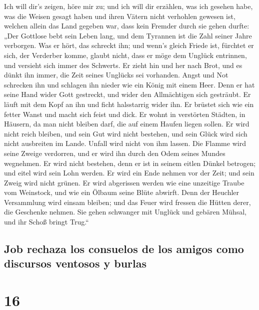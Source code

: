  Ich will dir's zeigen, höre mir zu; und ich will dir
erzählen, was ich gesehen habe,  was die Weisen gesagt
haben und ihren Vätern nicht verhohlen gewesen ist, 
welchen allein das Land gegeben war, dass kein Fremder durch sie gehen
durfte:  „Der Gottlose bebt sein Leben lang, und dem
Tyrannen ist die Zahl seiner Jahre verborgen.  Was er
hört, das schreckt ihn; und wenn's gleich Friede ist, fürchtet er sich,
der Verderber komme,  glaubt nicht, dass er möge dem
Unglück entrinnen, und versieht sich immer des Schwerts. 
Er zieht hin und her nach Brot, und es dünkt ihn immer, die Zeit seines
Unglücks sei vorhanden.  Angst und Not schrecken ihn und
schlagen ihn nieder wie ein König mit einem Heer.  Denn
er hat seine Hand wider Gott gestreckt, und wider den Allmächtigen sich
gesträubt.  Er läuft mit dem Kopf an ihn und ficht
halsstarrig wider ihn.  Er brüstet sich wie ein fetter
Wanst und macht sich feist und dick.  Er wohnt in
verstörten Städten, in Häusern, da man nicht bleiben darf, die auf einem
Haufen liegen sollen.  Er wird nicht reich bleiben, und
sein Gut wird nicht bestehen, und sein Glück wird sich nicht ausbreiten
im Lande.  Unfall wird nicht von ihm lassen. Die Flamme
wird seine Zweige verdorren, und er wird ihn durch den Odem seines
Mundes wegnehmen.  Er wird nicht bestehen, denn er ist in
seinem eitlen Dünkel betrogen; und eitel wird sein Lohn werden.
 Er wird ein Ende nehmen vor der Zeit; und sein Zweig
wird nicht grünen.  Er wird abgerissen werden wie eine
unzeitige Traube vom Weinstock, und wie ein Ölbaum seine Blüte abwirft.
 Denn der Heuchler Versammlung wird einsam bleiben; und
das Feuer wird fressen die Hütten derer, die Geschenke nehmen.
 Sie gehen schwanger mit Unglück und gebären Mühsal, und
ihr Schoß bringt Trug.``

\hypertarget{job-rechaza-los-consuelos-de-los-amigos-como-discursos-ventosos-y-burlas}{%
\subsection{Job rechaza los consuelos de los amigos como discursos
ventosos y
burlas}\label{job-rechaza-los-consuelos-de-los-amigos-como-discursos-ventosos-y-burlas}}

\hypertarget{section-15}{%
\section{16}\label{section-15}}

